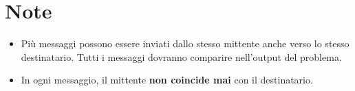 \documentclass[a4paper,11pt]{article}
\begin{document}
\section*{Note}
\begin{itemize}
  
    \item{Più messaggi possono essere inviati dallo stesso mittente anche verso lo stesso destinatario. Tutti i messaggi dovranno comparire nell'output del problema.}
    \item{In ogni messaggio, il mittente \textbf{non coincide mai} con il destinatario.}
\end{itemize}
\end{document}
